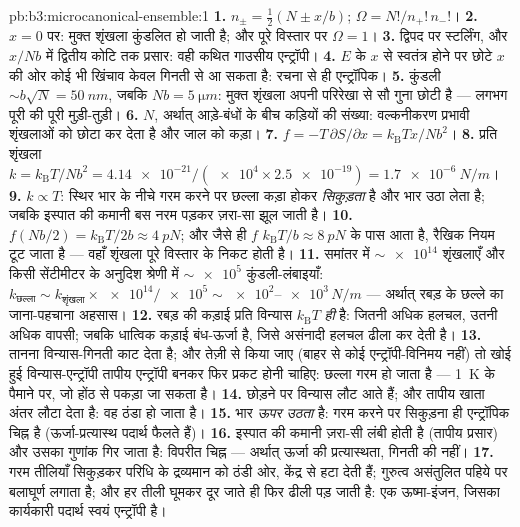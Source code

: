 \begin{solution}{pb:b3:microcanonical-ensemble:1}
\textbf{1.} $n_\pm = \tfrac12(N \pm x/b)$; $\Omega =
N!/n_+!\,n_-!$।
\textbf{2.} $x = 0$ पर: मुक्त शृंखला कुंडलित हो जाती है; और पूरे
विस्तार पर $\Omega = 1$।
\textbf{3.} द्विपद पर स्टर्लिंग, और
$x/Nb$ में द्वितीय कोटि तक प्रसार: वही कथित गाउसीय एन्ट्रॉपी।
\textbf{4.} $E$ के $x$ से स्वतंत्र होने पर छोटे
$x$ की ओर कोई भी खिंचाव केवल गिनती से आ सकता है: रचना से ही
एन्ट्रॉपिक।
\textbf{5.} कुंडली $\sim b\sqrt N = \qty{50}{nm}$, जबकि $Nb =
\qty{5}{\micro m}$: मुक्त शृंखला अपनी परिरेखा से सौ गुना छोटी है
--- लगभग पूरी की पूरी मुड़ी-तुड़ी।
\textbf{6.} $N$, अर्थात् आड़े-बंधों के बीच कड़ियों की संख्या:
वल्कनीकरण प्रभावी शृंखलाओं को छोटा कर देता है और जाल को कड़ा।
\textbf{7.} $f = -T\,\partial S/\partial x =
k_{\text{B}}Tx/Nb^2$।
\textbf{8.} प्रति शृंखला $k = k_{\text{B}}T/Nb^2 = \num{4.14e-21}/(\num{e4}
\times \num{2.5e-19}) = \qty{1.7e-6}{N/m}$।
\textbf{9.} $k \propto T$: स्थिर भार के नीचे गरम करने पर छल्ला
कड़ा होकर \emph{सिकुड़ता} है और भार उठा लेता है; जबकि इस्पात की
कमानी बस नरम पड़कर ज़रा-सा झूल जाती है।
\textbf{10.} $f(Nb/2) = k_{\text{B}}T/2b \approx \qty{4}{pN}$;
और जैसे ही $f$ $k_{\text{B}}T/b \approx
\qty{8}{pN}$ के पास आता है, रैखिक नियम टूट जाता है --- वहाँ शृंखला
पूरे विस्तार के निकट होती है।
\textbf{11.} समांतर में $\sim\num{e14}$ शृंखलाएँ और किसी
सेंटीमीटर के अनुदिश श्रेणी में $\sim\num{e5}$ कुंडली-लंबाइयाँ:
$k_{\text{छल्ला}} \sim k_{\text{शृंखला}} \times \num{e14}/\num{e5}
\sim \num{e2}$--$\num{e3}\,\unit{N/m}$ --- अर्थात् रबड़ के छल्ले का
जाना-पहचाना अहसास।
\textbf{12.} रबड़ की कड़ाई प्रति विन्यास $k_{\text{B}}T$
\emph{ही} है: जितनी अधिक हलचल, उतनी अधिक वापसी; जबकि धात्विक कड़ाई
बंध-ऊर्जा है, जिसे असंनादी हलचल ढीला कर देती है।
\textbf{13.} तानना विन्यास-गिनती काट देता है; और तेज़ी से किया जाए
(बाहर से कोई एन्ट्रॉपी-विनिमय नहीं) तो खोई हुई विन्यास-एन्ट्रॉपी
तापीय एन्ट्रॉपी बनकर फिर प्रकट होनी चाहिए: छल्ला गरम हो जाता है ---
\qty{1}{K} के पैमाने पर, जो होंठ से पकड़ा जा सकता है।
\textbf{14.} छोड़ने पर विन्यास लौट आते हैं; और तापीय खाता अंतर
लौटा देता है: वह ठंडा हो जाता है।
\textbf{15.} भार \emph{ऊपर उठता} है: गरम करने पर सिकुड़ना ही
एन्ट्रॉपिक चिह्न है (ऊर्जा-प्रत्यास्थ पदार्थ फैलते हैं)।
\textbf{16.} इस्पात की कमानी ज़रा-सी लंबी होती है (तापीय
प्रसार) और उसका गुणांक गिर जाता है: विपरीत चिह्न --- अर्थात्
ऊर्जा की प्रत्यास्थता, गिनती की नहीं।
\textbf{17.} गरम तीलियाँ सिकुड़कर परिधि के द्रव्यमान को ठंडी ओर,
केंद्र से हटा देती हैं; गुरुत्व असंतुलित पहिये पर बलाघूर्ण लगाता है;
और हर तीली घूमकर दूर जाते ही फिर ढीली पड़ जाती है: एक ऊष्मा-इंजन,
जिसका कार्यकारी पदार्थ स्वयं एन्ट्रॉपी है।

\end{solution}
